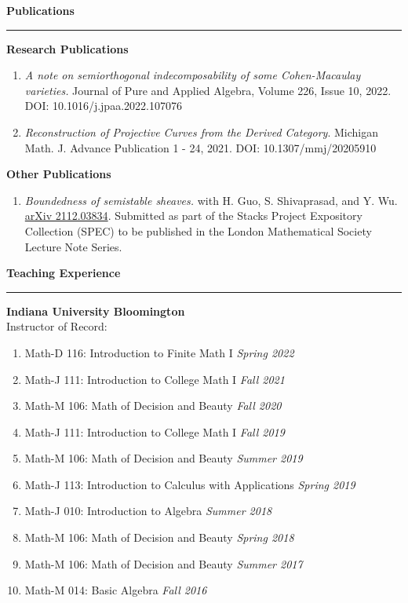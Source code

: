 \documentclass[showabstract,showacknowledgments,showpreface,showdedication,12pt]{iuphd}
\begin{document}
\noindent \textbf{Publications}
\vspace{1pt}
\hrule 
\vspace{\baselineskip}

\noindent \textbf{Research Publications}
\begin{enumerate}
      \item \emph{A note on semiorthogonal indecomposability of some Cohen-Macaulay varieties.} Journal of Pure and Applied Algebra, Volume 226, Issue 10, 2022. DOI: 10.1016/j.jpaa.2022.107076
      \item \emph{Reconstruction of Projective Curves from the Derived Category}. Michigan Math. J. Advance Publication 1 - 24, 2021. DOI: 10.1307/mmj/20205910
\end{enumerate}

\noindent \textbf{Other Publications}
\begin{enumerate}
      \item \emph{Boundedness of semistable sheaves.} with H. Guo, S. Shivaprasad, and Y. Wu. \href{https://arxiv.org/abs/2112.03834}{arXiv 2112.03834}. Submitted as part of the Stacks Project Expository Collection (SPEC) to be published in the London Mathematical Society Lecture Note Series.
\end{enumerate}

\thispagestyle{empty}

\noindent \textbf{Teaching Experience}
\vspace{1pt}
\hrule 
\vspace{\baselineskip}

\noindent\textbf{Indiana University Bloomington} \\
Instructor of Record:
\begin{enumerate}
      \item Math-D 116: Introduction to Finite Math I \hfill \emph{Spring 2022}
      \item Math-J 111: Introduction to College Math I \hfill \emph{Fall 2021}
      \item Math-M 106: Math of Decision and Beauty \hfill \emph{Fall 2020}
      \item Math-J 111: Introduction to College Math I \hfill \emph{Fall 2019}
      \item Math-M 106: Math of Decision and Beauty \hfill \emph{Summer 2019}
      \item Math-J 113: Introduction to Calculus with Applications \hfill \emph{Spring 2019}
      \item Math-J 010: Introduction to Algebra \hfill \emph{Summer 2018}
      \item Math-M 106: Math of Decision and Beauty \hfill \emph{Spring 2018}
      \item Math-M 106: Math of Decision and Beauty \hfill \emph{Summer 2017}
      \item Math-M 014: Basic Algebra \hfill \emph{Fall 2016}
\end{enumerate}
\end{document}
